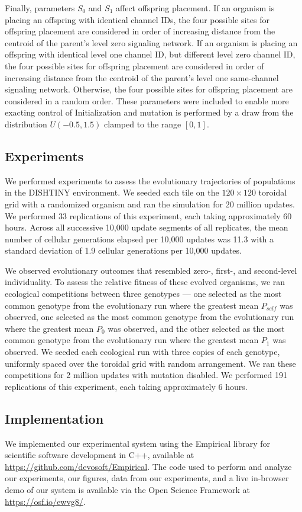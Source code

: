 Finally, parameters $S_0$ and $S_1$ affect offspring placement.
If an organism is placing an offspring with identical channel IDs, the four possible sites for offspring placement are considered in order of increasing distance from the centroid of the parent's level zero signaling network.
If an organism is placing an offspring with identical level one channel ID, but different level zero channel ID, the four possible sites for offspring placement are considered in order of increasing distance from the centroid of the parent's level one same-channel signaling network.
Otherwise, the four possible sites for offspring placement are considered in a random order.
These parameters were included to enable more exacting control of
Initialization and mutation is performed by a draw from the distribution $U(-0.5,1.5)$ clamped to the range $[0,1]$.

\subsection{Experiments}

We performed experiments to assess the evolutionary trajectories of populations %
in the DISHTINY environment.
We seeded each tile on the $120 \times 120$ toroidal grid with a randomized organism and ran the simulation for 20 million updates.
We performed 33 replications of this experiment, each taking approximately 60 hours.
Across all successive 10,000 update segments of all replicates, the mean number of cellular generations elapsed per 10,000 updates was 11.3 with a standard deviation of 1.9 cellular generations per 10,000 updates.

We observed evolutionary outcomes that resembled zero-, first-, and second-level individuality.
To assess the relative fitness of these evolved organisms, we ran ecological competitions between three genotypes --- one selected as the most common genotype from the evolutionary run where the greatest mean $P_{self}$ was observed, one selected as the most common genotype from the evolutionary run where the greatest mean $P_0$ was observed, and the other selected as the most common genotype from the evolutionary run where the greatest mean $P_1$ was observed.
We seeded each ecological run with three copies of each genotype, uniformly spaced over the toroidal grid with random arrangement. We ran these competitions for 2 million updates with mutation disabled.
We performed 191 replications of this experiment, each taking approximately 6 hours.


\subsection{Implementation}


We implemented our experimental system using the Empirical library for scientific software development in C++, available at \url{https://github.com/devosoft/Empirical}.  The code used to perform and analyze our experiments, our figures, data from our experiments, and a live in-browser demo of our system is available via the Open Science Framework at \url{https://osf.io/ewvg8/}.
